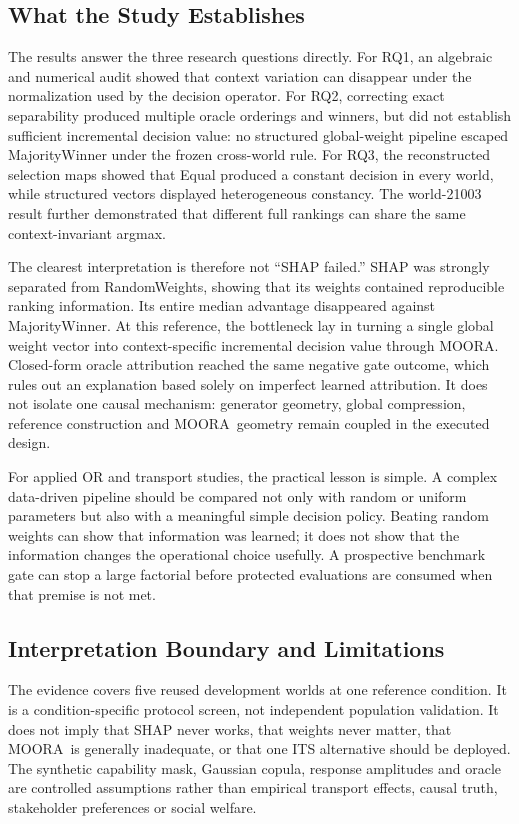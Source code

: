 \documentclass[runningheads]{llncs}
\newcommand{\MOORA}{MOORA}
\begin{document}
\subsection{What the Study Establishes}

The results answer the three research questions directly. For RQ1, an algebraic and numerical
audit showed that context variation can disappear under the normalization used by the decision
operator. For RQ2, correcting exact separability produced multiple oracle orderings and winners,
but did not establish sufficient incremental decision value: no structured global-weight
pipeline escaped MajorityWinner under the frozen cross-world rule. For RQ3, the reconstructed
selection maps showed that Equal produced a constant decision in every world, while structured
vectors displayed heterogeneous constancy. The world-21003 result further demonstrated that
different full rankings can share the same context-invariant argmax.

The clearest interpretation is therefore not ``SHAP failed.'' SHAP was strongly separated from
RandomWeights, showing that its weights contained reproducible ranking information. Its entire
median advantage disappeared against MajorityWinner. At this reference, the bottleneck lay in
turning a single global weight vector into context-specific incremental decision value through
\MOORA. Closed-form oracle attribution reached the same negative gate outcome, which rules out
an explanation based solely on imperfect learned attribution. It does not isolate one causal
mechanism: generator geometry, global compression, reference construction and \MOORA\ geometry
remain coupled in the executed design.

For applied OR and transport studies, the practical lesson is simple. A complex data-driven
pipeline should be compared not only with random or uniform parameters but also with a meaningful
simple decision policy. Beating random weights can show that information was learned; it does not
show that the information changes the operational choice usefully. A prospective benchmark gate
can stop a large factorial before protected evaluations are consumed when that premise is not
met.

\subsection{Interpretation Boundary and Limitations}

The evidence covers five reused development worlds at one reference condition. It is a
condition-specific protocol screen, not independent population validation. It does not imply
that SHAP never works, that weights never matter, that \MOORA\ is generally inadequate, or that
one ITS alternative should be deployed. The synthetic capability mask, Gaussian copula,
response amplitudes and oracle are controlled assumptions rather than empirical transport
effects, causal truth, stakeholder preferences or social welfare.
\end{document}
